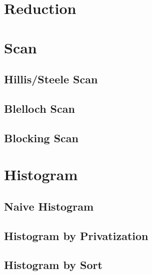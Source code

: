 \documentclass[12px,oz]{report}
\theoremstyle{indented}
\theoremstyle{indented}
\begin{document}
	\section{Reduction}
	\label{sec:al_reduction}
	
	
	\section{Scan}
	\label{sec:al_scan}
	
	
		\subsection{Hillis/Steele Scan}
		\label{sec:al_scan_hillis_steele}
		
		
		\subsection{Blelloch Scan}
		\label{sec:al_scan_blelloch}
		
		
		\subsection{Blocking Scan}
		\label{sec:al_scan_blocking}
		
	
	\section{Histogram}
	\label{sec:al_histogram}
	
	
		\subsection{Naive Histogram}
		\label{sec:al_hist_naive}
		
		
		\subsection{Histogram by Privatization}
		\label{sec:al_hist_privatization}
		
		
		\subsection{Histogram by Sort}
		\label{sec:al_hist_sort}
		
	
\end{document}

